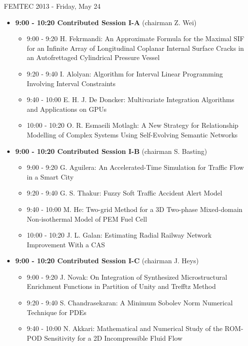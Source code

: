 \documentclass[10pt, A4]{article}%
\begin{document}
\centerline{\huge FEMTEC 2013 - Friday, May 24}
\vspace{4mm}
\begin{itemize}    
\item {\bf 9:00 - 10:20 Contributed Session I-A} (chairman Z. Wei) 
  \begin{itemize}
    \item 9:00 - 9:20 {H. Fekrmandi}: {An Approximate Formula for the Maximal SIF for an Infinite Array of Longitudinal Coplanar Internal Surface Cracks in an Autofrettaged Cylindrical Pressure Vessel} %
    \item 9:20 - 9:40 {I. Alolyan}: {Algorithm for Interval Linear  Programming Involving Interval Constraints} %
    \item 9:40 - 10:00 {E. H. J. De Doncker}: {Multivariate Integration Algorithms and Applications on GPUs} %
    \item 10:00 - 10:20 {O. R. Esmaeili Motlagh}: {A New Strategy for Relationship Modelling of Complex Systems Using Self-Evolving Semantic Networks}
  \end{itemize}
  \item {\bf 9:00 - 10:20 Contributed Session I-B} (chairman S. Basting) 
  \begin{itemize}
    \item 9:00 - 9:20 {G. Aguilera}: {An Accelerated-Time Simulation for Traffic Flow in a Smart City} %
    \item 9:20 - 9:40 {G. S. Thakur}: {Fuzzy Soft Traffic Accident Alert Model}
    \item 9:40 - 10:00 {M. He}: {Two-grid Method for a 3D Two-phase Mixed-domain Non-isothermal Model of PEM Fuel Cell}
    \item 10:00 - 10:20 {J. L. Galan}: {Estimating Radial Railway Network Improvement With a CAS} %
  \end{itemize}
    \item {\bf 9:00 - 10:20 Contributed Session I-C} (chairman J. Heys) 
  \begin{itemize}
    \item 9:00 - 9:20 {J. Novak}: {On Integration of Synthesized Microstructural Enrichment Functions in Partition of Unity and Trefftz Method}
    \item 9:20 - 9:40 {S. Chandrasekaran}: {A Minimum Sobolev Norm Numerical Technique for PDEs} %
    \item 9:40 - 10:00 {N. Akkari}: {Mathematical and Numerical Study of the ROM-POD Sensitivity for a 2D Incompressible Fluid Flow}

\end{itemize}
\end{itemize}
\end{document}
